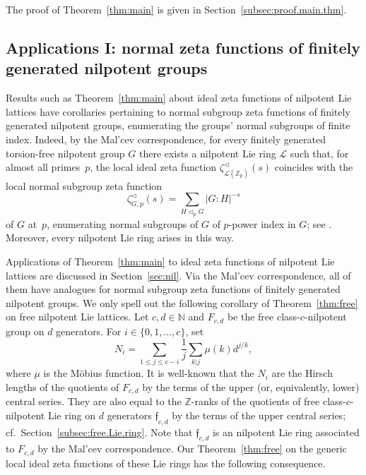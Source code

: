 \documentclass[11pt]{amsart}
\numberwithin{equation}{section}
\numberwithin{figure}{section}
\theoremstyle{plain}
\theoremstyle{definition}
\theoremstyle{remark}
\begin{document}
The proof of Theorem~\ref{thm:main} is given in
Section~\ref{subsec:proof.main.thm}.

\subsection{Applications I: normal zeta functions of finitely generated nilpotent groups}\label{subsec:appI}

Results such as Theorem~\ref{thm:main} about ideal zeta functions of
nilpotent Lie lattices have corollaries pertaining to {normal}
subgroup zeta functions of finitely generated nilpotent groups,
enumerating the groups' {normal} subgroups of finite index. Indeed, by
the Mal'cev correspondence, for every finitely generated torsion-free
nilpotent group $G$ there exists a nilpotent Lie ring ${\ensuremath{\mathcal{L}}}$ such
that, for almost all primes~$p$, the local ideal zeta function
$\zeta^{\triangleleft}_{{\ensuremath{\mathcal{L}}}({\ensuremath{\mathbb{Z}_p}})}(s)$ coincides with the local normal subgroup
zeta function
$$\zeta^{\triangleleft}_{G,p}(s) = \sum_{H {\triangleleft}_p G} |G:H|^{-s}$$ of $G$ at~$p$,
enumerating normal subgroups of $G$ of $p$-power index in $G$; see
\cite[Theorem~4.1]{GSS/88}. Moreover, every nilpotent Lie ring arises
in this way.

Applications of Theorem~\ref{thm:main} to ideal zeta functions of
nilpotent Lie lattices are discussed in Section~\ref{sec:nil}. Via the
Mal'cev correspondence, all of them have analogues for normal subgroup
zeta functions of finitely generated nilpotent groups. We only spell
out the following corollary of Theorem~\ref{thm:free} on free
nilpotent Lie lattices. Let $c,d\in{\ensuremath{\mathbb{N}}}$ and $F_{c,d}$ be the free
class-$c$-nilpotent group on $d$ generators. For $i\in
\{0,1,\dots,c\}$, set
\begin{equation}\label{equ:mobius}N_i 
                                      
= \sum_{1 \leq j\leq c-i} \frac{1}{j}\sum_{k|j}\mu(k)d^{j/k},
\end{equation} where $\mu$
is the M\"obius function. It is well-known that the $N_i$ are the
Hirsch lengths of the quotients of $F_{c,d}$ by the terms of the upper
(or, equivalently, lower) central series. They are also equal to the
${\ensuremath{\mathbb{Z}}}$-ranks of the quotients of free class-$c$-nilpotent Lie ring on
$d$ generators ${\ensuremath{\mathfrak{f}}}_{c,d}$ by the terms of the upper central series;
cf.\ Section~\ref{subsec:free.Lie.ring}. Note that ${\ensuremath{\mathfrak{f}}}_{c,d}$ is an
nilpotent Lie ring associated to $F_{c,d}$ by the Mal'cev
correspondence. Our Theorem~\ref{thm:free} on the generic local ideal
zeta functions of these Lie rings has the following consequence.
\end{document}
